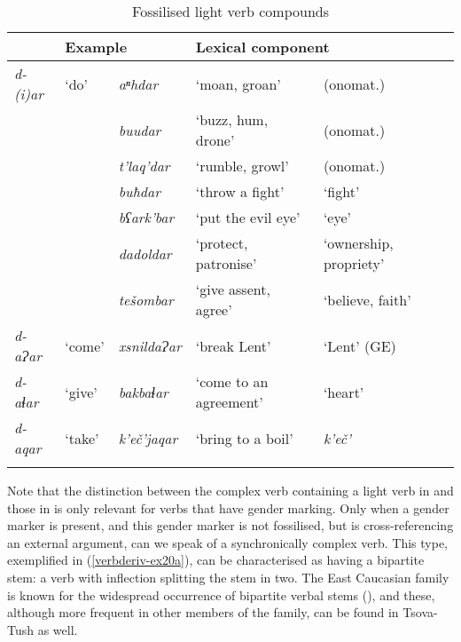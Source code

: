\begin{table}
	\small
	\begin{tabular}{ll ll ll}
		\lsptoprule
		\multicolumn{2}{l}{{Light verb}} & \multicolumn{2}{l}{{Example}} & \multicolumn{2}{l}{Lexical component} \\
		\midrule
		\textit{d-(i)ar} & `do' & \textit{aⁿhdar} & `moan, groan' & (onomat.) \\
				
		                &        & \textit{buudar}	& `buzz, hum, drone' & (onomat.) \\
		                &        & \textit{t'laq'dar} & `rumble, growl' & (onomat.) \\
		                &        & \textit{buħdar} & `throw a fight' & `fight' \\
		                &        & \textit{bʕark'bar} & `put the evil eye' & `eye' \\
		                &        & \textit{dadoldar} & `protect, patronise' & `ownership, propriety' \\
		                &        & \textit{tešombar} & `give assent, agree' & `believe, faith' \\
		\textit{d-aɁar} & `come' & \textit{xsnildaɁar} & `break Lent' & `Lent' (GE) \\
		\textit{d-aɬar} & `give' & \textit{bakbaɬar} & `come to an agreement' & `heart' \\
		\textit{d-aqar} & `take' & \textit{k'eč'jaqar} & `bring to a boil' & \textit{k'eč'} \\
		\lspbottomrule
	\end{tabular}
	\caption{Fossilised light verb compounds}
	\label{verbderiv-table-unilightverbs}
\end{table}

Note that the distinction between the complex verb containing a light verb in  and those in  is only relevant for verbs that have gender marking. Only when a gender marker is present, and this gender marker is not fossilised, but is cross-referencing an external argument, can we speak of a synchronically complex verb. This type, exemplified in (\ref{verbderiv-ex20a}), can be characterised as having a bipartite stem: a verb with inflection splitting the stem in two. The East Caucasian family is known for the widespread occurrence of bipartite verbal stems (\cite{nichols03bipartite}), and these, although more frequent in other members of the family, can be found in Tsova-Tush as well.
\pagebreak

